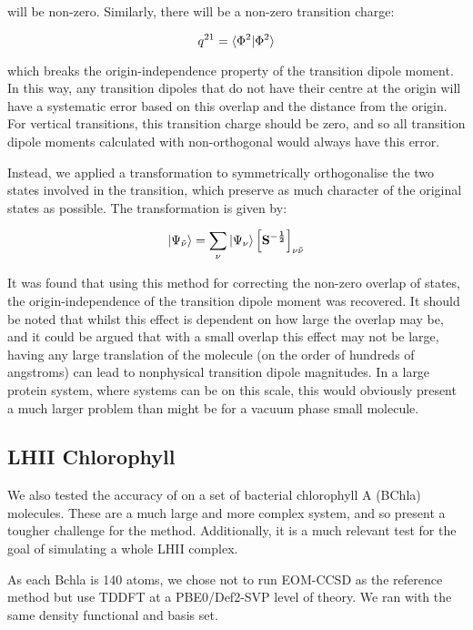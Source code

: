 will be non-zero. Similarly, there will be a non-zero transition charge:

\begin{equation}
q^{21} = \braket{\Phi^2|\Phi^2}
\end{equation}

which breaks the origin-independence property of the transition dipole moment. In
this way, any transition dipoles that do not have their centre at the origin will
have a systematic error based on this overlap and the distance from the origin.
For vertical transitions, this transition charge should be zero, and so all transition
dipole moments calculated with non-orthogonal \dscf would always have this error.

Instead, we applied a transformation to symmetrically orthogonalise the two states
involved in the transition, which preserve as much character of the original states
as possible. The transformation is given by:

\begin{equation}
\ket{\Psi_{\tilde{\nu}}} = \sum_{\nu} \ket{\Psi_\nu} \left[\mathbf{S^{-\frac{1}{2}}} \right]_{\nu\tilde{\nu}}
\end{equation}

It was found that using this method for correcting the non-zero overlap of states, 
the origin-independence of the transition dipole moment was recovered. It should
be noted that whilst this effect is dependent on how large the overlap may be, and
it could be argued that with a small overlap this effect may not be large, having 
any large translation of the molecule (on the order of hundreds of angstroms) can
lead to nonphysical transition dipole magnitudes. In a large protein system, where
systems can be on this scale, this would obviously present a much larger problem
than might be for a vacuum phase small molecule.

\subsection{LHII Chlorophyll}
\label{subsec:dscf_chl_tests}

We also tested the accuracy of \dscf on a set of bacterial chlorophyll A (BChla) 
molecules. These are a much large and more complex system, and so present a tougher
challenge for the \dscf method. Additionally, it is a much relevant test for the
goal of simulating a whole LHII complex.

As each Bchla is 140 atoms, we chose not to run EOM-CCSD as the reference method
but use TDDFT at a PBE0/Def2-SVP level of theory. We ran \dscf with the same
density functional and basis set.

